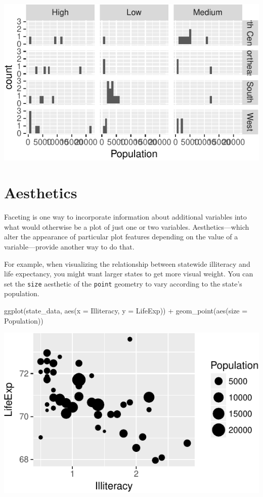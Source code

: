 \documentclass[
  12pt,
  oneside,openany]{book}
\newenvironment{Shaded}{\begin{snugshade}}{\end{snugshade}}
\newcommand{\AttributeTok}[1]{\textcolor[rgb]{0.77,0.63,0.00}{#1}}
\newcommand{\FunctionTok}[1]{\textcolor[rgb]{0.00,0.00,0.00}{#1}}
\newcommand{\NormalTok}[1]{#1}
\newcommand{\SpecialCharTok}[1]{\textcolor[rgb]{0.00,0.00,0.00}{#1}}
\begin{document}
\includegraphics{pdaps_files/figure-latex/facet-grid-1.pdf}

\hypertarget{aesthetics}{%
\section{Aesthetics}\label{aesthetics}}

Faceting is one way to incorporate information about additional variables into what would otherwise be a plot of just one or two variables. Aesthetics---which alter the appearance of particular plot features depending on the value of a variable---provide another way to do that.

For example, when visualizing the relationship between statewide illiteracy and life expectancy, you might want larger states to get more visual weight. You can set the \texttt{size} aesthetic of the \texttt{point} geometry to vary according to the state's population.

\begin{Shaded}
\begin{Highlighting}[]
\FunctionTok{ggplot}\NormalTok{(state\_data, }\FunctionTok{aes}\NormalTok{(}\AttributeTok{x =}\NormalTok{ Illiteracy, }\AttributeTok{y =}\NormalTok{ LifeExp)) }\SpecialCharTok{+}
  \FunctionTok{geom\_point}\NormalTok{(}\FunctionTok{aes}\NormalTok{(}\AttributeTok{size =}\NormalTok{ Population))}
\end{Highlighting}
\end{Shaded}

\includegraphics{pdaps_files/figure-latex/aes-size-1.pdf}
\end{document}
